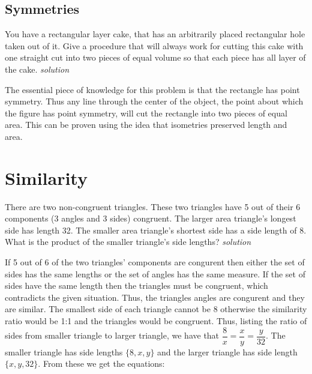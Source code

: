 \documentclass{amsbook}
\begin{document}
\section{Symmetries}
\begin{Exercise}[title={Layer Cake} ,difficulty=2 , label=8f1 ]
	You have a rectangular layer cake, that has an arbitrarily placed rectangular hole taken out of it. Give a procedure that will always work for cutting this cake with one straight cut into two pieces of equal volume so that each piece has all layer of the cake. 
	\hfill \emph{solution} 
\end{Exercise}
\begin{Answer}[ref={8f1}]
	The essential piece of knowledge for this problem is that the rectangle has point symmetry. Thus any line through the center of the object, the point about which the figure has point symmetry, will cut the rectangle into two pieces of equal area. This can be proven using the idea that isometries preserved length and area. 
\end{Answer}


\chapter{Similarity}
\begin{Exercise}[title={Almost the same}, difficulty=2, label=9a1]
There are two non-congruent triangles. These two triangles have 5 out of their 6 components (3 angles and 3 sides) congruent. The larger area triangle's longest side has length 32. The smaller area triangle's shortest side has a side length of 8. What is the product of the smaller triangle's side lengths?
\hfill \emph{solution} 
\end{Exercise}

\begin{Answer}[ref={9a1}]
If 5 out of 6 of the two triangles' components are congurent then either the set of sides has the same lengths or the set of angles has the same measure. If the set of sides have the same length then the triangles must be congruent, which contradicts the given situation. Thus, the triangles angles are congurent and they are similar. The smallest side of each triangle cannot be 8 otherwise the similarity ratio would be 1:1 and the triangles would be congruent. Thus, listing the ratio of sides from smaller triangle to larger triangle, we have that $\dfrac{8}{x}=\dfrac{x}{y}=\dfrac{y}{32}$. The smaller triangle has side lengths $\{8,x,y\}$ and the larger triangle has side length $\{x,y,32\}$. From these we get the equations:

\end{Answer}
\end{document}
